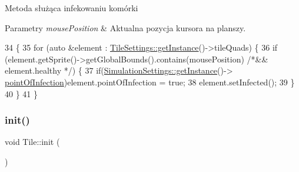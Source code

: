 Metoda służąca infekowaniu komórki


\begin{DoxyParams}{Parametry}
{\em mouse\+Position} & Aktualna pozycja kursora na planszy. \\
\hline
\end{DoxyParams}

\begin{DoxyCode}
34 \{
35     \textcolor{keywordflow}{for} (\textcolor{keyword}{auto} &element : \mbox{\hyperlink{class_tile_settings_a003ae6e78b97855c8592b2b4c0818914}{TileSettings::getInstance}}()->tileQuads) \{
36         \textcolor{keywordflow}{if} (element.getSprite()->getGlobalBounds().contains(mousePosition) \textcolor{comment}{/*&& element.healthy */}) \{
37             \textcolor{keywordflow}{if}(\mbox{\hyperlink{class_simulation_settings_ab69bcd8bb611656b17d1f655d09a3004}{SimulationSettings::getInstance}}()->
      \mbox{\hyperlink{class_simulation_settings_a3cf918e098904961a658c38047f607fd}{pointOfInfection}})element.pointOfInfection = \textcolor{keyword}{true};
38             element.setInfected();
39         \}
40     \}
41 \}
\end{DoxyCode}
\mbox{\label{class_tile_a96ce55d5fcb4b12880531af2138ba6b2}} 
\subsubsection{\texorpdfstring{init()}{init()}}
{\footnotesize\ttfamily void Tile\+::init (\begin{DoxyParamCaption}{ }\end{DoxyParamCaption})}

